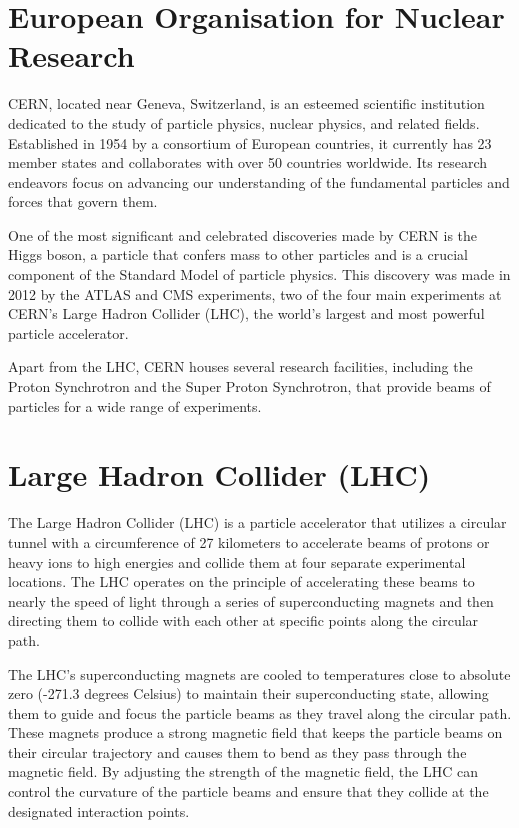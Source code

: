 \def \imgpath {"./figures/lhc"}

\section{European Organisation for Nuclear Research}
CERN, located near Geneva, Switzerland, is an esteemed scientific institution dedicated to the study of particle physics, nuclear physics, and related fields. Established in 1954 by a consortium of European countries, it currently has 23 member states and collaborates with over 50 countries worldwide. Its research endeavors focus on advancing our understanding of the fundamental particles and forces that govern them.

One of the most significant and celebrated discoveries made by CERN is the Higgs boson, a particle that confers mass to other particles and is a crucial component of the Standard Model of particle physics. This discovery was made in 2012 by the ATLAS and CMS experiments, two of the four main experiments at CERN's Large Hadron Collider (LHC), the world's largest and most powerful particle accelerator.

Apart from the LHC, CERN houses several research facilities, including the Proton Synchrotron and the Super Proton Synchrotron, that provide beams of particles for a wide range of experiments. %

\section{Large Hadron Collider (LHC)}

The Large Hadron Collider (LHC) is a particle accelerator that utilizes a circular tunnel with a circumference of 27 kilometers to accelerate beams of protons or heavy ions to high energies and collide them at four separate experimental locations. The LHC operates on the principle of accelerating these beams to nearly the speed of light through a series of superconducting magnets and then directing them to collide with each other at specific points along the circular path.

The LHC's superconducting magnets are cooled to temperatures close to absolute zero (-271.3 degrees Celsius) to maintain their superconducting state, allowing them to guide and focus the particle beams as they travel along the circular path. These magnets produce a strong magnetic field that keeps the particle beams on their circular trajectory and causes them to bend as they pass through the magnetic field. By adjusting the strength of the magnetic field, the LHC can control the curvature of the particle beams and ensure that they collide at the designated interaction points.

